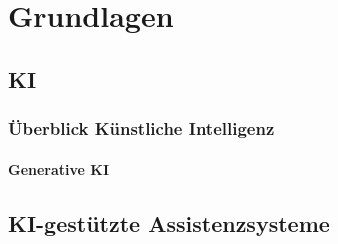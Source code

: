 \chapter{Grundlagen}

\section{KI}

\subsection{Überblick Künstliche Intelligenz}



\subsubsection{Generative KI}

\section{KI-gestützte Assistenzsysteme}